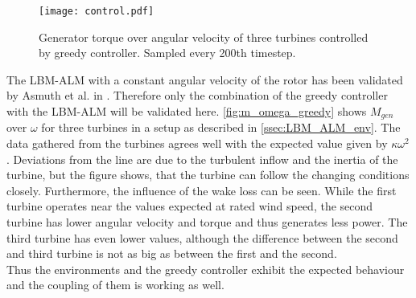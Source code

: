 \begin{figure}[h]
	\centering
	\texttt{[image: control.pdf]}
	\caption{Generator torque over angular velocity of three turbines controlled by greedy controller. Sampled every 200th timestep.}
	\label{fig:m_omega_greedy}
\end{figure}
The LBM-ALM with a constant angular velocity of the rotor has been validated by Asmuth et al. in \cite{asmuth_actuator_2019}. Therefore only the combination of the greedy controller with the LBM-ALM will be validated here. \autoref{fig:m_omega_greedy} shows $M_{gen}$ over $\omega$ for three turbines in a setup as described in \autoref{ssec:LBM_ALM_env}. The data gathered from the turbines agrees well with the expected value given by $\kappa \omega^2$. Deviations from the line are due to the turbulent inflow and the inertia of the turbine, but the figure shows, that the turbine can follow the changing conditions closely. Furthermore, the influence of the wake loss can be seen. While the first turbine operates near the values expected at rated wind speed, the second turbine has lower angular velocity and torque and thus generates less power. The third turbine has even lower values, although the difference between the second and third turbine is not as big as between the first and the second. \\
Thus the environments and the greedy controller exhibit the expected behaviour and the coupling of them is working as well.
